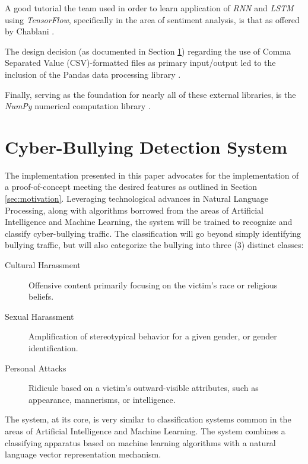 \documentclass[conference]{sig-alternate-05-2015}
\begin{document}
A good tutorial the team used in order to learn application of \textit{RNN} and
\textit{LSTM} using \textit{TensorFlow}, specifically in the area of sentiment
analysis, is that as offered by Chablani \cite{chablani-2017}.

The design decision (as documented in Section \ref{sec:design}) regarding the
use of Comma Separated Value (CSV)-formatted files as primary input/output led
to the inclusion of the Pandas data processing library
\cite{mckinney-proc-scipy-2010}.

Finally, serving as the foundation for nearly all of these external libraries,
is the \textit{NumPy} numerical computation library \cite{oliphant2006guide}.

\section{Cyber-Bullying Detection System}\label{sec:design}
The implementation presented in this paper advocates for the implementation of a
proof-of-concept meeting the desired features as outlined in Section \ref{sec:motivation}.
Leveraging technological advances in Natural
Language Processing, along with algorithms borrowed from the areas of Artificial
Intelligence and Machine Learning, the system will be trained to recognize and
classify cyber-bullying traffic. The classification will go beyond simply
identifying bullying traffic, but will also categorize the bullying into three
(3) distinct classes:
\begin{description}
    \item[Cultural Harassment] Offensive content primarily focusing on the
    victim's race or religious beliefs.
    \item[Sexual Harassment] Amplification of stereotypical behavior for a given
    gender, or gender identification.
    \item[Personal Attacks] Ridicule based on a victim's outward-visible
    attributes, such as appearance, mannerisms, or intelligence.
\end{description}

The system, at its core, is very similar to classification systems
common in the areas of Artificial Intelligence and Machine Learning. The system
combines a classifying apparatus based on machine learning algorithms with a
natural language vector representation mechanism.
\end{document}
